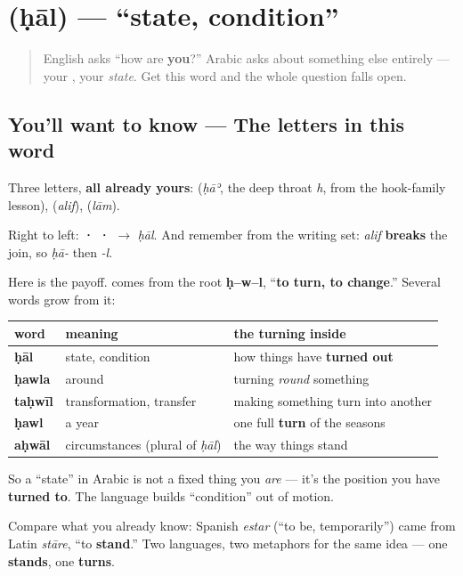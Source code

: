 \section[\texorpdfstring{\ar{حال} (ḥāl)}{حال (ḥāl)}]{ (ḥāl) — \textquotedblleft{}state, condition\textquotedblright{}}

\label{lesson:AR-C03-hal}



\begin{quote}
English asks \textquotedblleft{}how are \textbf{you}?\textquotedblright{} Arabic asks about something else entirely — your \textbf{}, your \emph{state}. Get this word and the whole question falls open.
\end{quote}

\subsection*{You'll want to know — The letters in this word}
Three letters, \textbf{all already yours}: \textbf{} (\emph{ḥāʾ}, the deep throat \emph{h}, from the hook-family lesson), \textbf{} (\emph{alif}), \textbf{} (\emph{lām}).

Right to left: \textbf{ ·  · } $\to$ \emph{ḥāl}. And remember from the writing set: \emph{alif} \textbf{breaks} the join, so \emph{ḥā-} then \emph{-l}.

\begin{culture}
Here is the payoff. \textbf{} comes from the root \textbf{ḥ–w–l}, \textquotedblleft{}\textbf{to turn, to change}.\textquotedblright{} Several words grow from it:

\noindent
\begin{tabularx}{\linewidth}{@{}>{\raggedright\arraybackslash}X>{\raggedright\arraybackslash}X>{\raggedright\arraybackslash}X@{}}
\toprule
\textbf{word} & \textbf{meaning} & \textbf{the turning inside} \\
\midrule
\textbf{ḥāl} & state, condition & how things have \textbf{turned out} \\
\textbf{ḥawla} & around & turning \emph{round} something \\
\textbf{taḥwīl} & transformation, transfer & making something turn into another \\
\textbf{ḥawl} & a year & one full \textbf{turn} of the seasons \\
\textbf{aḥwāl} & circumstances (plural of \emph{ḥāl}) & the way things stand \\
\bottomrule
\end{tabularx}

So a \textquotedblleft{}state\textquotedblright{} in Arabic is not a fixed thing you \emph{are} — it's the position you have \textbf{turned to}. The language builds \textquotedblleft{}condition\textquotedblright{} out of motion.

Compare what you already know: Spanish \emph{estar} (\textquotedblleft{}to be, temporarily\textquotedblright{}) came from Latin \emph{stāre}, \textquotedblleft{}to \textbf{stand}.\textquotedblright{} Two languages, two metaphors for the same idea — one \textbf{stands}, one \textbf{turns}.
\end{culture}


